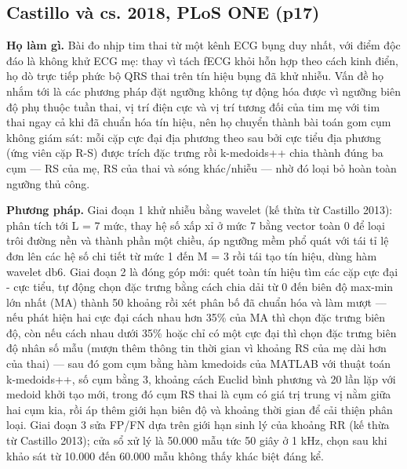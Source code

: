 \documentclass[12pt,a4paper]{article}
\begin{document}
\subsection{Castillo và cs. 2018, PLoS ONE \normalfont\small (p17)}
\par\vspace{2pt}
\par\vspace{4pt}
\noindent \textbf{Họ làm gì.} Bài đo nhịp tim thai từ một kênh ECG bụng duy nhất, với điểm độc đáo là không khử ECG mẹ: thay vì tách fECG khỏi hỗn hợp theo cách kinh điển, họ dò trực tiếp phức bộ QRS thai trên tín hiệu bụng đã khử nhiễu. Vấn đề họ nhắm tới là các phương pháp đặt ngưỡng không tự động hóa được vì ngưỡng biên độ phụ thuộc tuần thai, vị trí điện cực và vị trí tương đối của tim mẹ với tim thai ngay cả khi đã chuẩn hóa tín hiệu, nên họ chuyển thành bài toán gom cụm không giám sát: mỗi cặp cực đại địa phương theo sau bởi cực tiểu địa phương (ứng viên cặp R-S) được trích đặc trưng rồi k-medoids++ chia thành đúng ba cụm — RS của mẹ, RS của thai và sóng khác/nhiễu — nhờ đó loại bỏ hoàn toàn ngưỡng thủ công.\par\vspace{3pt}
\noindent \textbf{Phương pháp.} Giai đoạn 1 khử nhiễu bằng wavelet (kế thừa từ Castillo 2013): phân tích tới L = 7 mức, thay hệ số xấp xỉ ở mức 7 bằng vector toàn 0 để loại trôi đường nền và thành phần một chiều, áp ngưỡng mềm phổ quát với tái tỉ lệ đơn lên các hệ số chi tiết từ mức 1 đến M = 3 rồi tái tạo tín hiệu, dùng hàm wavelet db6. Giai đoạn 2 là đóng góp mới: quét toàn tín hiệu tìm các cặp cực đại - cực tiểu, tự động chọn đặc trưng bằng cách chia dải từ 0 đến biên độ max-min lớn nhất (MA) thành 50 khoảng rồi xét phân bố đã chuẩn hóa và làm mượt — nếu phát hiện hai cực đại cách nhau hơn 35\% của MA thì chọn đặc trưng biên độ, còn nếu cách nhau dưới 35\% hoặc chỉ có một cực đại thì chọn đặc trưng biên độ nhân số mẫu (mượn thêm thông tin thời gian vì khoảng RS của mẹ dài hơn của thai) — sau đó gom cụm bằng hàm kmedoids của MATLAB với thuật toán k-medoids++, số cụm bằng 3, khoảng cách Euclid bình phương và 20 lần lặp với medoid khởi tạo mới, trong đó cụm RS thai là cụm có giá trị trung vị nằm giữa hai cụm kia, rồi áp thêm giới hạn biên độ và khoảng thời gian để cải thiện phân loại. Giai đoạn 3 sửa FP/FN dựa trên giới hạn sinh lý của khoảng RR (kế thừa từ Castillo 2013); cửa sổ xử lý là 50.000 mẫu tức 50 giây ở 1 kHz, chọn sau khi khảo sát từ 10.000 đến 60.000 mẫu không thấy khác biệt đáng kể.\par\vspace{3pt}
\end{document}
